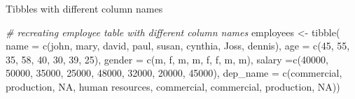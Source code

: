 \documentclass[
]{book}
\newenvironment{Shaded}{\begin{snugshade}}{\end{snugshade}}
\newcommand{\AttributeTok}[1]{\textcolor[rgb]{0.77,0.63,0.00}{#1}}
\newcommand{\CommentTok}[1]{\textcolor[rgb]{0.56,0.35,0.01}{\textit{#1}}}
\newcommand{\ConstantTok}[1]{\textcolor[rgb]{0.00,0.00,0.00}{#1}}
\newcommand{\DecValTok}[1]{\textcolor[rgb]{0.00,0.00,0.81}{#1}}
\newcommand{\FunctionTok}[1]{\textcolor[rgb]{0.00,0.00,0.00}{#1}}
\newcommand{\NormalTok}[1]{#1}
\newcommand{\OtherTok}[1]{\textcolor[rgb]{0.56,0.35,0.01}{#1}}
\newcommand{\StringTok}[1]{\textcolor[rgb]{0.31,0.60,0.02}{#1}}
\begin{document}
Tibbles with different column names

\begin{Shaded}
\begin{Highlighting}[]
\CommentTok{\# recreating employee table with different column names}
\NormalTok{employees }\OtherTok{\textless{}{-}} \FunctionTok{tibble}\NormalTok{(}
    \AttributeTok{name =} \FunctionTok{c}\NormalTok{(}\StringTok{\textquotesingle{}john\textquotesingle{}}\NormalTok{, }\StringTok{\textquotesingle{}mary\textquotesingle{}}\NormalTok{, }\StringTok{\textquotesingle{}david\textquotesingle{}}\NormalTok{, }\StringTok{\textquotesingle{}paul\textquotesingle{}}\NormalTok{, }\StringTok{\textquotesingle{}susan\textquotesingle{}}\NormalTok{, }\StringTok{\textquotesingle{}cynthia\textquotesingle{}}\NormalTok{, }\StringTok{\textquotesingle{}Joss\textquotesingle{}}\NormalTok{, }\StringTok{\textquotesingle{}dennis\textquotesingle{}}\NormalTok{),}
    \AttributeTok{age =} \FunctionTok{c}\NormalTok{(}\DecValTok{45}\NormalTok{, }\DecValTok{55}\NormalTok{, }\DecValTok{35}\NormalTok{, }\DecValTok{58}\NormalTok{, }\DecValTok{40}\NormalTok{, }\DecValTok{30}\NormalTok{, }\DecValTok{39}\NormalTok{, }\DecValTok{25}\NormalTok{),}
    \AttributeTok{gender =} \FunctionTok{c}\NormalTok{(}\StringTok{\textquotesingle{}m\textquotesingle{}}\NormalTok{, }\StringTok{\textquotesingle{}f\textquotesingle{}}\NormalTok{, }\StringTok{\textquotesingle{}m\textquotesingle{}}\NormalTok{, }\StringTok{\textquotesingle{}m\textquotesingle{}}\NormalTok{, }\StringTok{\textquotesingle{}f\textquotesingle{}}\NormalTok{, }\StringTok{\textquotesingle{}f\textquotesingle{}}\NormalTok{, }\StringTok{\textquotesingle{}m\textquotesingle{}}\NormalTok{, }\StringTok{\textquotesingle{}m\textquotesingle{}}\NormalTok{),}
    \AttributeTok{salary =}\FunctionTok{c}\NormalTok{(}\DecValTok{40000}\NormalTok{, }\DecValTok{50000}\NormalTok{, }\DecValTok{35000}\NormalTok{, }\DecValTok{25000}\NormalTok{, }\DecValTok{48000}\NormalTok{, }\DecValTok{32000}\NormalTok{, }\DecValTok{20000}\NormalTok{, }\DecValTok{45000}\NormalTok{),}
    \AttributeTok{dep\_name =} \FunctionTok{c}\NormalTok{(}\StringTok{\textquotesingle{}commercial\textquotesingle{}}\NormalTok{, }\StringTok{\textquotesingle{}production\textquotesingle{}}\NormalTok{, }\ConstantTok{NA}\NormalTok{, }\StringTok{\textquotesingle{}human resources\textquotesingle{}}\NormalTok{, }
                 \StringTok{\textquotesingle{}commercial\textquotesingle{}}\NormalTok{, }\StringTok{\textquotesingle{}commercial\textquotesingle{}}\NormalTok{, }\StringTok{\textquotesingle{}production\textquotesingle{}}\NormalTok{, }\ConstantTok{NA}\NormalTok{))}

\end{Highlighting}
\end{Shaded}
\end{document}
